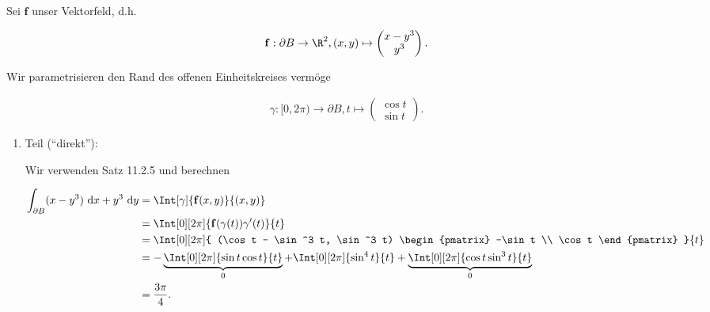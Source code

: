 \begin{solution}

Sei $\mathbf f$ unser Vektorfeld, d.h.

\begin{align*}
    \mathbf f:
        \partial B \to \R^2,
        (x, y)
        \mapsto
        \begin{pmatrix}
            x - y^3 \\ y^3
        \end{pmatrix}.
\end{align*}

Wir parametrisieren den Rand des offenen Einheitskreises vermöge

\begin{align*}
    \gamma:
        [0, 2 \pi) \to \partial B,
        t
        \mapsto
        \begin{pmatrix}
            \cos t \\ \sin t
        \end{pmatrix}.
\end{align*}

\begin{enumerate}[label = \arabic*.]

    \item Teil (\enquote{direkt}):
    
    
    Wir verwenden Satz 11.2.5 und berechnen

    \begin{align*}
        \int_{\partial B}
        (x - y^3)
        ~\mathrm d x
    +
    y^3
    ~\mathrm d y
    & =
    \Int[\gamma]
    {
        \mathbf f(x, y)
    }{(x, y)} \\
    & =
    \Int[0][2 \pi]
    {
        \mathbf f(\gamma(t)) \gamma^\prime(t)
    }{t} \\
    & =
    \Int[0][2 \pi]
    {
        (\cos t - \sin^3 t, \sin^3 t)
        \begin{pmatrix}
            -\sin t \\
             \cos t
        \end{pmatrix}
        }{t} \\
        & =
        -
        \underbrace
        {
            \Int[0][2 \pi]
            {
                \sin t \cos t
            }{t}
        }_0
        +
        \Int[0][2 \pi]
        {
            \sin^4 t
        }{t}
        +
        \underbrace
        {
            \Int[0][2 \pi]
            {
                \cos t \sin^3 t
            }{t}
        }_0 \\
        & =
        \frac{3 \pi}{4}.
    \end{align*}


\end{enumerate}
\end{solution}

